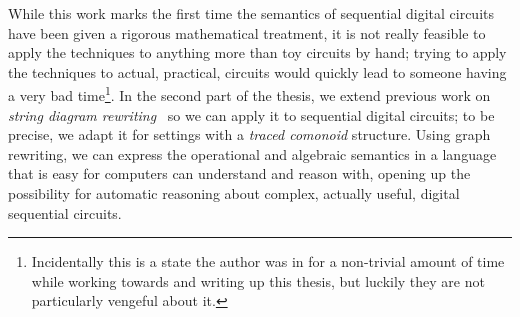 While this work marks the first time the semantics of sequential digital
circuits have been given a rigorous mathematical treatment, it is not really
feasible to apply the techniques to anything more than toy circuits by hand;
trying to apply the techniques to actual, practical, circuits would quickly lead
to someone having a very bad time\footnote{
    Incidentally this is a state the author was in for a non-trivial amount of
    time while working towards and writing up this thesis, but luckily they are
    not particularly vengeful about it.
}.
In the second part of the thesis, we extend previous work on
\emph{string diagram rewriting}~\cite{bonchi2022string,bonchi2022stringa,bonchi2022stringb}
so we can apply it to sequential digital circuits; to be precise, we adapt it
for settings with a \emph{traced comonoid} structure.
Using graph rewriting, we can express the operational and algebraic semantics
in a language that is easy for computers can understand and reason with, opening
up the possibility for automatic reasoning about complex, actually useful,
digital sequential circuits.